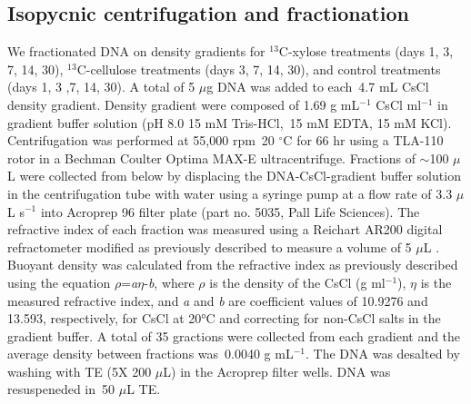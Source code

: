 \documentclass{article}
\begin{document}
\subsection{Isopycnic centrifugation and fractionation} 
We fractionated DNA on density gradients for $^{13}$C-xylose treatments (days
1, 3, 7, 14, 30), $^{13}$C-cellulose treatments (days 3, 7, 14, 30), and
control treatments (days 1, 3 ,7, 14, 30). A total of 5 $\mu$g DNA was added to
each~4.7 mL CsCl density gradient.  Density gradient were composed of 1.69
g mL$^{-1}$ CsCl ml$^{-1}$ in gradient buffer solution (pH 8.0 15 mM
Tris-HCl,~15 mM EDTA, 15 mM KCl). Centrifugation was performed at 55,000 rpm~20
$^{\circ}$C for 66 hr using a TLA-110 rotor in a Bechman Coulter Optima MAX-E
ultracentrifuge. Fractions of $\sim$100 $\mu$L were collected from below by
displacing the DNA-CsCl-gradient buffer solution in the centrifugation tube
with water using a syringe pump at a flow rate of 3.3 $\mu$L s$^{-1}$
\citep{Manefield_2002} into Acroprep 96 filter plate (part no. 5035, Pall Life
Sciences). The refractive index of each fraction was measured using a Reichart
AR200 digital refractometer modified as previously described to measure
a volume of 5 $\mu$L \citep{Buckley_2007}. Buoyant density was calculated from
the refractive index as previously described \citep{Buckley_2007} using the
equation $\rho$=\textit{a}$\eta$-\textit{b}, where $\rho$ is the density of the
CsCl (g ml$^{-1}$), $\eta$ is the measured refractive index, and \textit{a} and
\textit{b} are coefficient values of 10.9276 and 13.593, respectively, for CsCl
at 20°C \citep{9780408708036} and correcting for non-CsCl salts in the gradient
buffer. A total of 35 gractions were collected from each gradient and the
average density between fractions was~0.0040 g mL$^{-1}$. The DNA was desalted
by washing with TE (5X 200 $\mu$L) in the Acroprep filter wells. DNA was
resuspeneded in~50 $\mu$L TE. 
\end{document}
